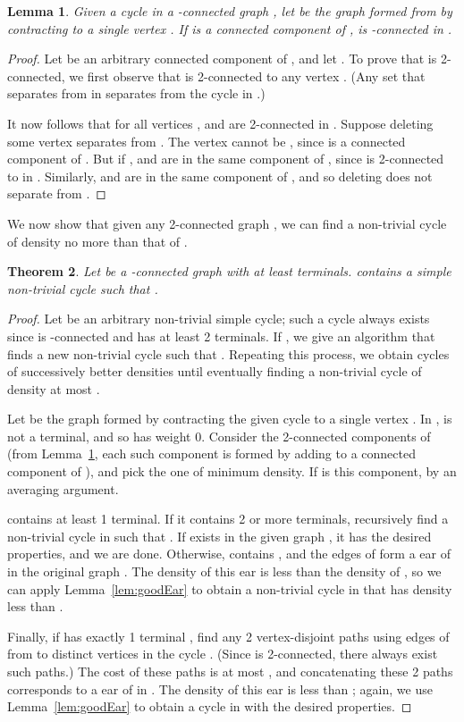 \documentclass[11pt]{article}
\newtheorem{lemma}{Lemma}[section]
\newtheorem{theorem}[lemma]{Theorem}
\begin{document}
\begin{lemma}\label{lem:2connComp}
  Given a cycle  in a -connected graph , let  be the graph
  formed from  by contracting  to a single vertex . If  is
  a connected component of ,  is -connected in
  .
\end{lemma}
\begin{proof}
  Let  be an arbitrary connected component of , and let . To prove that  is 2-connected, we first observe
  that  is 2-connected to any vertex . (Any set that
  separates  from  in  separates  from the cycle  in
  .)

  It now follows that for all vertices ,  and  are
  2-connected in . Suppose deleting some vertex  separates 
  from . The vertex  cannot be , since  is a connected
  component of . But if ,  and  are in the
  same component of , since  is 2-connected to  in
  . Similarly,  and  are in the same component of ,
  and so deleting  does not separate  from .
\end{proof}

We now show that given any 2-connected graph , we can find a
non-trivial cycle of density no more than that of .

\begin{theorem}\label{thm:cycleExists} 
  Let  be a -connected graph with at least  terminals. 
  contains a simple non-trivial cycle  such that .
\end{theorem}
\begin{proof}
  Let  be an arbitrary non-trivial simple cycle; such a cycle
  always exists since  is -connected and has at least 2
  terminals.  If , we give an algorithm that
  finds a new non-trivial cycle  such that .
  Repeating this process, we obtain cycles of successively better
  densities until eventually finding a non-trivial cycle  of
  density at most .

  Let  be the graph formed by contracting the given cycle  to a
  single vertex . In ,  is not a terminal, and so has weight
  0. Consider the 2-connected components of  (from
  Lemma~\ref{lem:2connComp}, each such component is formed by adding
   to a connected component of ), and pick the one of
  minimum density. If  is this component,  by
  an averaging argument.

   contains at least 1 terminal. If it contains 2 or more
  terminals, recursively find a non-trivial cycle  in  such
  that . If  exists in the
  given graph , it has the desired properties, and we are
  done. Otherwise,  contains , and the edges of  form a ear
  of  in the original graph . The density of this ear is less
  than the density of , so we can apply Lemma~\ref{lem:goodEar} to
  obtain a non-trivial cycle in  that has density less than
  .

  Finally, if  has exactly 1 terminal , find any 2
  vertex-disjoint paths using edges of  from  to distinct
  vertices in the cycle . (Since  is 2-connected, there always
  exist such paths.) The cost of these paths is at most , and
  concatenating these 2 paths corresponds to a ear of  in .  The
  density of this ear is less than ; again, we use
  Lemma~\ref{lem:goodEar} to obtain a cycle in  with the desired
  properties.
\end{proof}
\end{document}
